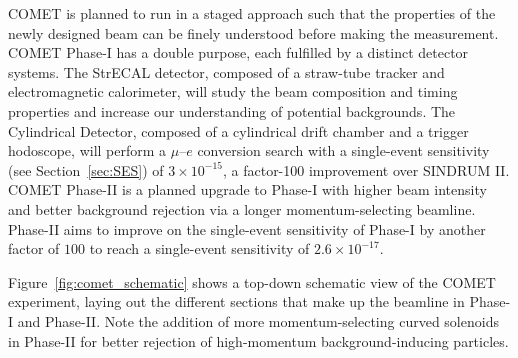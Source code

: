 COMET is planned to run in a staged approach such that the properties of the
newly designed beam can be finely understood before making the measurement.
COMET Phase-I has a double purpose, each fulfilled by a distinct detector
systems. The StrECAL detector, composed of a straw-tube tracker and
electromagnetic calorimeter, will study the beam composition and timing
properties and increase our understanding of potential backgrounds. The
Cylindrical Detector, composed of a cylindrical drift chamber and a trigger
hodoscope, will perform a $\mu$--$e$ conversion search with a single-event
sensitivity (see Section~\ref{sec:SES}) of $3\times 10^{-15}$, a factor-100 improvement over SINDRUM II.
COMET Phase-II is a planned upgrade to Phase-I with higher beam intensity and
better background rejection via a longer momentum-selecting beamline. Phase-II
aims to improve on the single-event sensitivity of Phase-I by another factor of
$100$ to reach a single-event sensitivity of $2.6\times 10^{-17}$.

Figure~\ref{fig:comet_schematic} shows a top-down schematic view of the COMET
experiment, laying out the different sections that make up the beamline in
Phase-I and Phase-II. Note the addition of more momentum-selecting curved
solenoids in Phase-II for better rejection of high-momentum background-inducing
particles.


